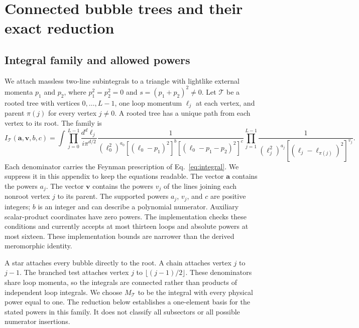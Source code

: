 \section{Connected bubble trees and their exact reduction}
\label{app:loop-tree}
\subsection{Integral family and allowed powers}
We attach massless two-line subintegrals to a triangle with lightlike external momenta $p_1$ and $p_2$, where $p_1^2=p_2^2=0$ and $s=(p_1+p_2)^2\ne0$. Let $\mathcal T$ be a rooted tree with vertices $0,\ldots,L-1$, one loop momentum $\ell_j$ at each vertex, and parent $\pi(j)$ for every vertex $j\ne0$. A rooted tree has a unique path from each vertex to its root. The family is
\begin{equation}
 I_{\mathcal T}(\boldsymbol a,\boldsymbol v,b,c)=
 \int\prod_{j=0}^{L-1}\frac{d^d\ell_j}{i\pi^{d/2}}
 \frac{1}{(\ell_0^2)^{a_0}[(\ell_0-p_1)^2]^b
 [ (\ell_0-p_1-p_2)^2]^c}
 \prod_{j=1}^{L-1}
 \frac{1}{(\ell_j^2)^{a_j}[(\ell_j-\ell_{\pi(j)})^2]^{v_j}}.
 \label{eq:loop-tree-family}
\end{equation}
Each denominator carries the Feynman prescription of Eq.~\eqref{eq:integral}. We suppress it in this appendix to keep the equations readable. The vector $\boldsymbol a$ contains the powers $a_j$. The vector $\boldsymbol v$ contains the powers $v_j$ of the lines joining each nonroot vertex $j$ to its parent. The supported powers $a_j$, $v_j$, and $c$ are positive integers; $b$ is an integer and can describe a polynomial numerator. Auxiliary scalar-product coordinates have zero powers. The implementation checks these conditions and currently accepts at most thirteen loops and absolute powers at most sixteen. These implementation bounds are narrower than the derived meromorphic identity.

A star attaches every bubble directly to the root. A chain attaches vertex $j$ to $j-1$. The branched test attaches vertex $j$ to $\lfloor(j-1)/2\rfloor$. These denominators share loop momenta, so the integrals are connected rather than products of independent loop integrals. We choose $M_{\mathcal T}$ to be the integral with every physical power equal to one. The reduction below establishes a one-element basis for the stated powers in this family. It does not classify all subsectors or all possible numerator insertions.

